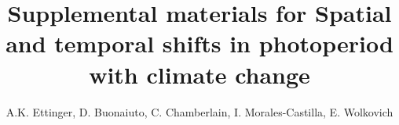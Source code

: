 \documentclass{article}
\begin{document}
 
\title{Supplemental materials for Spatial and temporal shifts in photoperiod with climate change} %

\author{A.K. Ettinger, D. Buonaiuto, C. Chamberlain, I. Morales-Castilla, E. Wolkovich}
\maketitle  %
\end{document}
